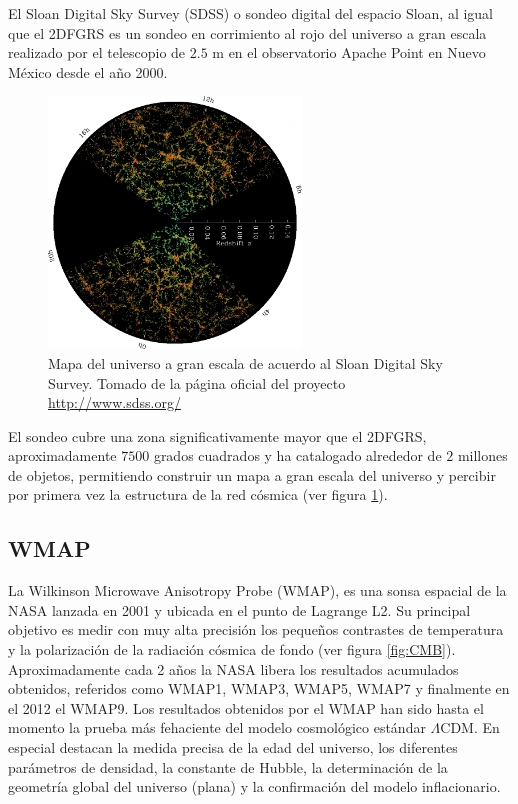 El Sloan Digital Sky Survey (SDSS) o sondeo digital del espacio Sloan, al 
igual que el 2DFGRS es un sondeo en corrimiento al rojo del universo a 
gran escala realizado por el telescopio de $2.5$ m en el observatorio Apache 
Point en Nuevo México desde el año 2000.


\begin{figure}[htbp]
	\centering
	\includegraphics[width=0.6\textwidth]
	{./figures/1_introduction/SDSS.png}
	
	\caption{\small{Mapa del universo a gran escala de acuerdo al Sloan 
	Digital Sky Survey. Tomado de la página oficial del proyecto 
	\url{http://www.sdss.org/}}}
	
	\label{fig:SDSS}
\end{figure}


El sondeo cubre una zona significativamente mayor que el 2DFGRS, 
aproxi\-madamente $7500$ grados cuadrados y ha catalogado alrededor de 
$2$ millones de objetos, permitiendo construir un mapa a gran escala del 
universo y percibir por primera vez la estructura de la red cósmica 
(ver figura \ref{fig:SDSS}).
	
	
	\subsection*{WMAP}
	\label{subsec:WMAP}


La Wilkinson Microwave Anisotropy Probe (WMAP), es una sonsa espacial de 
la NASA lanzada en 2001 y ubicada en el punto de Lagrange L2. Su principal 
objetivo es medir con muy alta precisión los pequeños contrastes de 
temperatura y la polarización de la radiación cósmica de fondo (ver figura 
\ref{fig:CMB}). Aproximadamente cada 2 años la NASA libera los resultados
acumulados obtenidos, referidos como WMAP1, WMAP3, WMAP5, WMAP7 y 
finalmente en el 2012 el WMAP9. Los resultados obtenidos por el WMAP han 
sido hasta el momento la prueba más fehaciente del modelo cosmológico 
estándar $\Lambda$CDM. En especial destacan la medida precisa de la edad del
universo, los diferentes parámetros de densidad, la constante de Hubble, 
la determinación de la geometría global del universo (plana) y la 
confirmación del modelo inflacionario.

